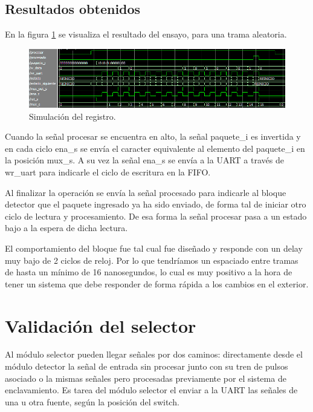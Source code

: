 	\subsection{Resultados obtenidos}
				
		En la figura \ref{fig:Test_Registro} se visualiza el resultado del ensayo, para una trama aleatoria.
		
	\begin{figure}[h]
	\centering
	\includegraphics[scale=0.6]{./Figures/Test/Registro}
		\caption{Simulación del registro.}
		\label{fig:Test_Registro}
	\end{figure}
	
	Cuando la señal procesar se encuentra en alto, la señal paquete\_i es invertida y en cada ciclo ena\_s se envía el caracter equivalente al elemento del paquete\_i en la posición mux\_s. A su vez la señal ena\_s se envía a la UART a través de wr\_uart para indicarle el ciclo de escritura en la FIFO.
	
	Al finalizar la operación se envía la señal procesado para indicarle al bloque detector que el paquete ingresado ya ha sido enviado, de forma tal de iniciar otro ciclo de lectura y procesamiento. De esa forma la señal procesar pasa a un estado bajo a la espera de dicha lectura.
	
	El comportamiento del bloque fue tal cual fue diseñado y responde con un delay muy bajo de 2 ciclos de reloj. Por lo que tendríamos un espaciado entre tramas de hasta un mínimo de 16 nanosegundos, lo cual es muy positivo a la hora de tener un sistema que debe responder de forma rápida a los cambios en el exterior.	
	
\section{Validación del selector}

	Al módulo selector pueden llegar señales por dos caminos: directamente desde el módulo detector la señal de entrada sin procesar junto con su tren de pulsos asociado o la mismas señales pero procesadas previamente por el sistema de enclavamiento. Es tarea del módulo selector el enviar a la UART las señales de una u otra fuente, según la posición del switch.	
	
